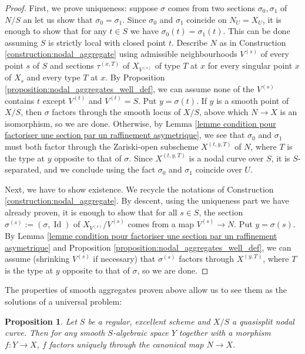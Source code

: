 \documentclass[a4paper,12pt]{amsart} %
\numberwithin{equation}{subsection}
\DeclareMathOperator{\Id}{Id}
\theoremstyle{definition}
\theoremstyle{plain}%
\newtheorem{proposition}[definition]{Proposition}
\theoremstyle{remark}
\begin{document}
\begin{proof}
First, we prove uniqueness: suppose $\sigma$ comes from two sections $\sigma_0,\sigma_1$ of $N/S$ an let us show that $\sigma_0=\sigma_1$. Since $\sigma_0$ and $\sigma_1$ coincide on $N_U=X_U$, it is enough to show that for any $t\in S$ we have $\sigma_0(t)=\sigma_1(t)$. This can be done assuming $S$ is strictly local with closed point $t$. Describe $N$ as in Construction \ref{construction:nodal_aggregate} using admissible neighbourhoods $V^{(s)}$ of every point $s$ of $S$ and sections $\tau^{(x,T)}$ of $X_{V^{(s)}}$ of type $T$ at $x$ for every singular point $x$ of $X_{s}$ and every type $T$ at $x$. By Proposition \ref{proposition:nodal_aggregates_well_def}, we can assume none of the $V^{(s)}$ contains $t$ except $V^{(t)}$ and $V^{(t)}=S$. Put $y=\sigma(t)$. If $y$ is a smooth point of $X/S$, then $\sigma$ factors through the smooth locus of $X/S$, above which $N\to X$ is an isomorphism, so we are done. Otherwise, by Lemma \ref{lemme condition pour factoriser une section par un raffinement asymetrique}, we see that $\sigma_0$ and $\sigma_1$ must both factor through the Zariski-open subscheme $X^{(t,y,T)}$ of $N$, where $T$ is the type at $y$ opposite to that of $\sigma$. Since $X^{(t,y,T)}$ is a nodal curve over $S$, it is $S$-separated, and we conclude using the fact $\sigma_0$ and $\sigma_1$ coincide over $U$.

Next, we have to show existence. We recycle the notations of Construction \ref{construction:nodal_aggregate}. By descent, using the uniqueness part we have already proven, it is enough to show that for all $s\in S$, the section $\sigma^{(s)}:=(\sigma,\Id)$ of $X_{V^{(s)}}/V^{(s)}$ comes from a map $V^{(s)}\to N$. Put $y=\sigma(s)$. By Lemma \ref{lemme condition pour factoriser une section par un raffinement asymetrique} and Proposition \ref{proposition:nodal_aggregates_well_def}, we can assume (shrinking $V^{(s)}$ if necessary) that $\sigma^{(s)}$ factors through $X^{(y,T)}$, where $T$ is the type at $y$ opposite to that of $\sigma$, so we are done.
\end{proof}

The properties of smooth aggregates proven above allow us to see them as the solutions of a universal problem:

\begin{proposition}\label{proposition:universal_ppty_of_nodal_aggregates}
Let $S$ be a regular, excellent scheme and $X/S$ a quasisplit nodal curve. Then for any smooth $S$-algebraic space $Y$ together with a morphism $f\colon Y\to X$, $f$ factors uniquely through the canonical map $N\to X$.
\end{proposition}
\end{document}
